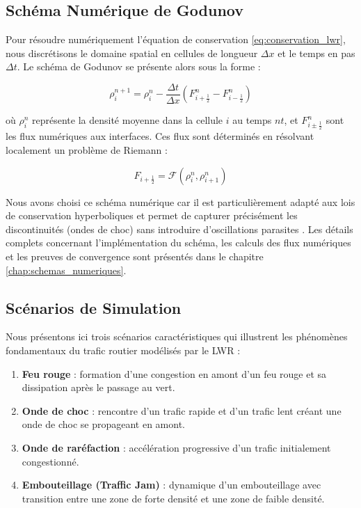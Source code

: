 \subsection{Schéma Numérique de Godunov}
\label{subsec:godunov}

Pour résoudre numériquement l'équation de conservation \eqref{eq:conservation_lwr}, nous discrétisons le domaine spatial en cellules de longueur $\Delta x$ et le temps en pas $\Delta t$. Le schéma de Godunov \cite{godunov1959finite,leveque1992numerical} se présente alors sous la forme :

\begin{equation}
\rho_i^{n+1} = \rho_i^n - \frac{\Delta t}{\Delta x}(F_{i+\frac{1}{2}}^n - F_{i-\frac{1}{2}}^n)
\end{equation}

où $\rho_i^n$ représente la densité moyenne dans la cellule $i$ au temps $n$\Delta$ t$, et $F_{i\pm\frac{1}{2}}^n$ sont les flux numériques aux interfaces. Ces flux sont déterminés en résolvant localement un problème de Riemann :

\begin{equation}
F_{i+\frac{1}{2}} = \mathcal{F}(\rho_i^n, \rho_{i+1}^n)
\end{equation}
    
Nous avons choisi ce schéma numérique car il est particulièrement adapté aux lois de conservation hyperboliques et permet de capturer précisément les discontinuités (ondes de choc) sans introduire d'oscillations parasites \cite{toro2013riemann}. Les détails complets concernant l'implémentation du schéma, les calculs des flux numériques et les preuves de convergence sont présentés dans le chapitre \ref{chap:schemas_numeriques}.
    
\subsection{Scénarios de Simulation}
\label{subsec:scenarios}

Nous présentons ici trois scénarios caractéristiques qui illustrent les phénomènes fondamentaux du trafic routier modélisés par le LWR :

\begin{enumerate}
    \item \textbf{Feu rouge} : formation d'une congestion en amont d'un feu rouge et sa dissipation après le passage au vert.
    \item \textbf{Onde de choc} : rencontre d'un trafic rapide et d'un trafic lent créant une onde de choc se propageant en amont.
    \item \textbf{Onde de raréfaction} : accélération progressive d'un trafic initialement congestionné.
    \item \textbf{Embouteillage (Traffic Jam)} : dynamique d'un embouteillage avec transition entre une zone de forte densité et une zone de faible densité.
\end{enumerate}

